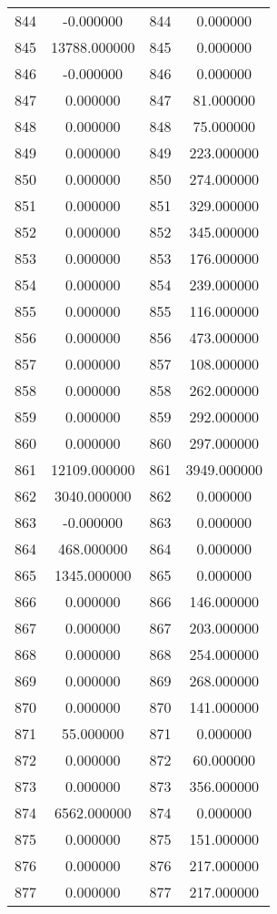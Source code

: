 \documentclass[12pt]{article}
\begin{document}
\begin{longtable}{@{}cccc@{}}
844 & -0.000000 & 844 & 0.000000 \\
845 & 13788.000000 & 845 & 0.000000 \\
846 & -0.000000 & 846 & 0.000000 \\
847 & 0.000000 & 847 & 81.000000 \\
848 & 0.000000 & 848 & 75.000000 \\
849 & 0.000000 & 849 & 223.000000 \\
850 & 0.000000 & 850 & 274.000000 \\
851 & 0.000000 & 851 & 329.000000 \\
852 & 0.000000 & 852 & 345.000000 \\
853 & 0.000000 & 853 & 176.000000 \\
854 & 0.000000 & 854 & 239.000000 \\
855 & 0.000000 & 855 & 116.000000 \\
856 & 0.000000 & 856 & 473.000000 \\
857 & 0.000000 & 857 & 108.000000 \\
858 & 0.000000 & 858 & 262.000000 \\
859 & 0.000000 & 859 & 292.000000 \\
860 & 0.000000 & 860 & 297.000000 \\
861 & 12109.000000 & 861 & 3949.000000 \\
862 & 3040.000000 & 862 & 0.000000 \\
863 & -0.000000 & 863 & 0.000000 \\
864 & 468.000000 & 864 & 0.000000 \\
865 & 1345.000000 & 865 & 0.000000 \\
866 & 0.000000 & 866 & 146.000000 \\
867 & 0.000000 & 867 & 203.000000 \\
868 & 0.000000 & 868 & 254.000000 \\
869 & 0.000000 & 869 & 268.000000 \\
870 & 0.000000 & 870 & 141.000000 \\
871 & 55.000000 & 871 & 0.000000 \\
872 & 0.000000 & 872 & 60.000000 \\
873 & 0.000000 & 873 & 356.000000 \\
874 & 6562.000000 & 874 & 0.000000 \\
875 & 0.000000 & 875 & 151.000000 \\
876 & 0.000000 & 876 & 217.000000 \\
877 & 0.000000 & 877 & 217.000000 \\

\end{longtable}
\end{document}
